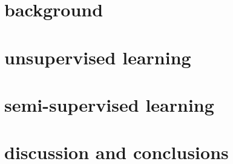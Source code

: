 \documentclass[\classfontsize,\papersize,twoside,showtrims,extrafontsizes]{memoir}  %
\begin{document}
\prefrontmatter

\cleartoevenpage

\cleartooddpage

\cleartoevenpage

\frontmatter








\glsaddall{}
\clearforchapter
\printnoidxglossary[title=Acronyms, toctitle=acronyms, type=\acronymtype]
\clearforchapter
\printnoidxglossary[title=Glossary, toctitle=glossary]

\clearforchapter
\printnomenclature

\clearforchapter
\listoffigures*
{}

\clearforchapter
\listoftables*
{}

\clearforchapter
\tableofcontents*

\clearforchapter
\mylistoftodos

\mainmatter

\part[background]{background}\label{part:background}




\part[unsupervised learning]{unsupervised learning}\label{part:unsupervised-learning}




\part[semi-supervised learning]{semi-supervised learning}\label{part:semi-supervised-learning}


\part[discussion and conclusions]{discussion and conclusions}\label{part:discussion-and-conclusion}


\end{document}
